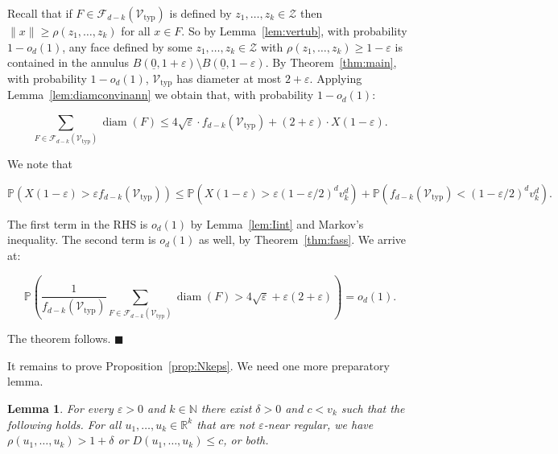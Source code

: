 \documentclass[11pt]{article}%
\newenvironment{proofof}[1]{\vspace{1ex}\noindent{\bf Proof of #1.}}{\hspace*{\fill}$\blacksquare$\vspace{1ex}}
\newtheorem{lemma} [theorem] {Lemma}%
\newcommand{\Fcal}[0]{\ensuremath{{\mathcal F}}}
\newcommand{\Vcal}[0]{\ensuremath{{\mathcal V}}}
\newcommand{\Zcal}[0]{\ensuremath{{\mathcal Z}}}
\newcommand{\eR}[0]{\ensuremath{ \mathbb R}}
\newcommand{\eN}[0]{\ensuremath{ \mathbb N}}
\newcommand{\norm}[1]{\ensuremath{\|#1\|}}
\newcommand{\Pee}[0]{\ensuremath{{\mathbb P}}}
\newcommand{\eps}{\varepsilon}
\newcommand{\orig}{\underline{0}}
\DeclareMathOperator{\diam}{diam}
\newcommand{\Vtyp}[0]{\Vcal_{\text{typ}}}
\begin{document}
\begin{proofof}{Theorem~\ref{thm:diambigface}}
Recall that if $F \in \Fcal_{d-k}(\Vtyp)$ is defined by $z_1,\dots,z_k \in \Zcal$ then 
$\norm{x} \geq \rho(z_1,\dots,z_k)$ for all $x \in F$.
So by Lemma~\ref{lem:vertub}, with probability $1-o_d(1)$, 
any face defined by some $z_1,\dots,z_k \in \Zcal$ with $\rho(z_1,\dots,z_k) \geq 1-\eps$ is contained in the annulus 
$B(\orig,1+\eps)\setminus B(\orig,1-\eps)$.
By Theorem~\ref{thm:main}, with probability $1-o_d(1)$, $\Vtyp$ has diameter at most $2+\eps$.
Applying Lemma~\ref{lem:diamconvinann} we obtain that, with probability $1-o_d(1)$:

$$ \sum_{F \in \Fcal_{d-k}(\Vtyp)} \diam(F) \leq 4\sqrt{\eps}\cdot f_{d-k}(\Vtyp) + (2+\eps)\cdot X(1-\eps). $$

\noindent
We note that 

$$ \Pee\left( X(1-\eps) > \eps f_{d-k}(\Vtyp) \right) \leq \Pee\left( X(1-\eps) > \eps(1-\eps/2)^dv_k^d \right)
+ \Pee\left( f_{d-k}(\Vtyp) < (1-\eps/2)^dv_k^d \right). $$

\noindent 
The first term in the RHS is $o_d(1)$ by Lemma~\ref{lem:Iint} and Markov's inequality.
The second term is $o_d(1)$ as well, by Theorem~\ref{thm:fass}.
We arrive at:

$$ \Pee\left( \frac{1}{f_{d-k}(\Vtyp)} \sum_{F \in \Fcal_{d-k}(\Vtyp)} \diam(F) > 
4\sqrt{\eps} + \eps(2+\eps) \right) = o_d(1). $$

\noindent
The theorem follows. 
\end{proofof}

It remains to prove Proposition~\ref{prop:Nkeps}.
We need one more preparatory lemma.

\begin{lemma}\label{lem:zevenendertig}
For every $\eps>0$ and $k\in\eN$ there exist $\delta>0$ and $c < v_k$ 
such that the following holds. 
For all $u_1,\dots,u_k \in \eR^k$ that are not $\eps$-near regular, we have 
$\rho(u_1,\dots,u_k) > 1+\delta$ or $D(u_1,\dots,u_k) \leq c$, or both.
\end{lemma}
\end{document}
